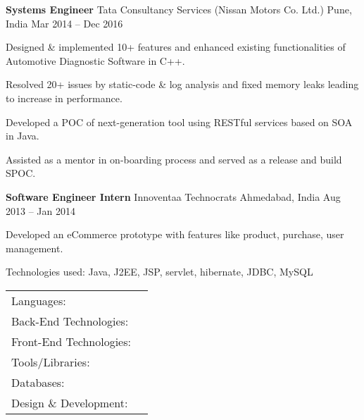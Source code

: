 \documentclass[]{awesome-cv}
\begin{document}
\vspace{-7mm}
\begin{cventries}
	\cventry
	{\textbf{Systems Engineer}}
	{Tata Consultancy Services (Nissan Motors Co. Ltd.)}
	{Pune, India}
	{Mar 2014 – Dec 2016}
	{
	\vspace{1mm}
	\begin{cvresponsiblties}
		\item {Designed \& implemented 10+ features and enhanced existing functionalities of Automotive Diagnostic Software in C++.}
		\item {Resolved 20+ issues by static-code \& log analysis and fixed memory leaks leading to increase in performance.}
		\item {Developed a POC of next-generation tool using RESTful services based on SOA in Java.}
		\item {Assisted as a mentor in on-boarding process and served as a release and build SPOC.}
	\end{cvresponsiblties}
	\vspace{-2mm}
	}
	\cventry
	{\textbf{Software Engineer Intern}}
	{Innoventaa Technocrats}
	{Ahmedabad, India}
	{Aug 2013 – Jan 2014}
	{
	\vspace{1mm}
	\begin{cvresponsiblties}
		\item {Developed an eCommerce prototype with features like product, purchase, user management.}
		\item {Technologies used: Java, J2EE, JSP, servlet, hibernate, JDBC, MySQL}
		\end{cvresponsiblties}
	}
\end{cventries}
\vspace{-5.5mm}
\vspace{-4mm}
\begin{cventries}
	\cventry
	{}
	{\def\arraystretch{1.25}{\begin{tabular}{ l l }
	    \vspace{0.4mm}
		Languages:  & {\skill{ Java, JavaScript(ES6), C++, Python}} \\
		\vspace{0.4mm}
		Back-End Technologies:  & {\skill{ Spring, Hibernate, J2EE, flask, Node.js, RabbitMQ, MVC, AWS Lambda, Kafka, Zookeeper}} \\
		\vspace{0.4mm}
		Front-End Technologies:  & {\skill{ HTML5, CSS3, Bootstrap, AngularJS, React, Redux}} \\
		\vspace{0.4mm}
		Tools/Libraries:  & {\skill{ Git, SVN, socket.io, Maven,  eclipse, IntelliJ, JUnit, OpenCV, Docker}} \\
		\vspace{0.4mm}
		Databases:  & {\skill{ MySQL, SQLite, redis, MongoDB, cassandra, DynamoDB}} \\
		\vspace{0.4mm}
		Design \& Development:  & {\skill{ Agile, Scrum, Design Patterns, OAuth2, REST, SOAP, GraphQL}} \\
		\end{tabular}}}
	{}
	{}
	{}
\end{cventries}
\end{document}
